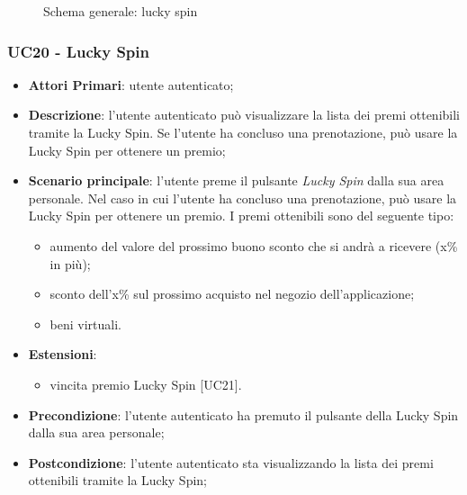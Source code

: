 \begin{figure}[h]
	\centering
	\caption{Schema generale: lucky spin}
\end{figure}
\subsubsection{UC20 - Lucky Spin}
\begin{itemize}
	\item \textbf{Attori Primari}: utente autenticato;
	\item \textbf{Descrizione}:	l'utente autenticato può visualizzare la lista dei premi ottenibili tramite la Lucky Spin\glo. Se l'utente ha concluso una prenotazione, può usare la Lucky Spin per ottenere un premio;
	\item \textbf{Scenario principale}: l'utente preme il pulsante \textit{Lucky Spin} dalla sua area personale. Nel caso in cui l'utente ha concluso una prenotazione, può usare la Lucky Spin per ottenere un premio. I premi ottenibili sono del seguente tipo:
	\begin{itemize}
		\item aumento del valore del prossimo buono sconto che si andrà a ricevere (x\% in più);
		\item sconto dell'x\% sul prossimo acquisto nel negozio dell'applicazione;
		\item beni virtuali.
	\end{itemize}
	\item \textbf{Estensioni}: 
	\begin{itemize}
		\item vincita premio Lucky Spin [UC21].
	\end{itemize}
	\item \textbf{Precondizione}: l'utente autenticato ha premuto il pulsante della Lucky Spin dalla sua area personale;
	\item \textbf{Postcondizione}: l'utente autenticato sta visualizzando la lista dei premi ottenibili tramite la Lucky Spin;
\end{itemize}
